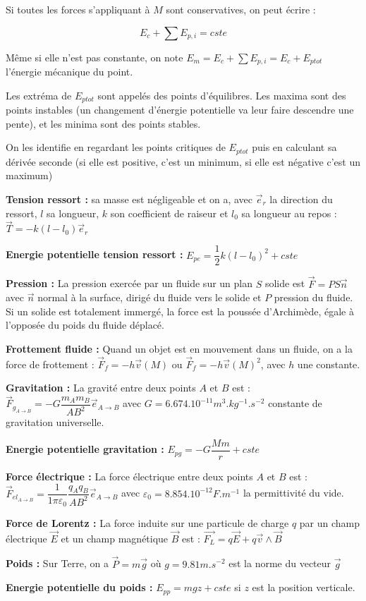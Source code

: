 \documentclass[a4paper,12pt]{book}
\newcommand{\Thr}[2]{\begin{tcolorbox}[sharp corners, colback=white,colframe=red!10!blue!30!green!75!, title=Théorème : #1]#2\end{tcolorbox}}
\renewcommand{\Vec}[1]{\overrightarrow{#1}}
\begin{document}
\Thr{Conservation de l'énergie mécanique TEM}{Si toutes les forces s'appliquant à $M$ sont conservatives, on peut écrire :
\par $$E_c + \sum E_{p,i} = cste$$
\par Même si elle n'est pas constante, on note $E_m =E_c + \sum E_{p,i} = E_c + E_{ptot}$ l'énergie mécanique du point.
\par Les extréma de $E_{ptot}$ sont appelés des points d'équilibres. Les maxima sont des points instables (un changement d'énergie potentielle va leur faire descendre une pente), et les minima sont des points stables.
\par On les identifie en regardant les points critiques de $E_{ptot}$ puis en calculant sa dérivée seconde (si elle est positive, c'est un minimum, si elle est négative c'est un maximum)}

\Thr{Modélisation des forces usuelles}{\textbf{Tension ressort :} sa masse est négligeable et on a, avec $\Vec{e}_r$ la direction du ressort, $l$ sa longueur, $k$ son coefficient de raiseur et $l_0$ sa longueur au repos : $\Vec{T} = -k(l-l_0)\Vec{e}_r$
\par\textbf{Energie potentielle tension ressort :} $E_{pe}= \dfrac{1}{2}k(l-l_0)^2+cste$
\par\textbf{Pression :} La pression exercée par un fluide sur un plan $S$ solide est $\Vec{F} = PS\Vec{n}$ avec $\Vec{n}$ normal à la surface, dirigé du fluide vers le solide et $P$ pression du fluide. Si un solide est totalement immergé, la force est la poussée d'Archimède, égale à l'opposée du poids du fluide déplacé.
\par\textbf{Frottement fluide :} Quand un objet est en mouvement dans un fluide, on a la force de frottement : $\Vec{F}_f = -h\Vec{v}(M)$ ou $\Vec{F}_f = -h\Vec{v}(M)^2$, avec $h$ une constante.
\par\textbf{Gravitation :} La gravité entre deux points $A$ et $B$ est : $\Vec{F}_{g_{A\to B}} = -G\dfrac{m_Am_B}{AB^2}\Vec{e}_{A\to B}$ avec $G=6.674.10^{-11} m^3.kg^{-1}.s^{-2}$ constante de gravitation universelle.
\par\textbf{Energie potentielle gravitation :} $E_{pg} = -G\dfrac{Mm}{r}+cste$ 
\par\textbf{Force électrique :} La force électrique entre deux points $A$ et $B$ est : $\Vec{F}_{el_{A\to B}} = \dfrac{1}{1\pi\varepsilon_0}\dfrac{q_Aq_B}{AB^2}\Vec{e}_{A\to B}$ avec $\varepsilon_0 = 8.854.10^{-12} F.m^{-1}$ la permittivité du vide.
\par\textbf{Force de Lorentz :} La force induite sur une particule de charge $q$ par un champ électrique $\Vec{E}$ et un champ magnétique $\Vec{B}$ est : $\Vec{F_L} = q\Vec{E} + q\Vec{v}\wedge \Vec{B}$ 
\par\textbf{Poids :} Sur Terre, on a $\Vec{P} = m\Vec{g}$ où $g=9.81 m.s^{-2}$ est la norme du vecteur $\Vec{g}$
\par\textbf{Energie potentielle du poids :} $E_{pp} = mgz+cste$ si $z$ est la position verticale.}
\end{document}
